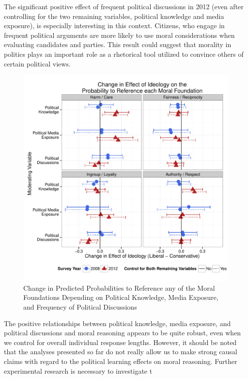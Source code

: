 \documentclass[12pt]{paper}
\begin{document}
The significant positive effect of frequent political discussions in 2012 (even after controlling for the two remaining variables, political knowledge and media exposure), is especially interesting in this context. Citizens, who engage in frequent political arguments are more likely to use moral considerations when evaluating candidates and parties. This result could suggest that morality in politics plays an important role as a rhetorical tool utilized to convince others of certain political views.

\begin{figure}\centering
\includegraphics[scale=.6]{../calc/fig/m3b_learn.pdf}
\caption{Change in Predicted Probabilities to Reference any of the Moral Foundations Depending on Political Knowledge, Media Exposure, and Frequency of Political Discussions}\label{fig:m3_learn}
\end{figure}

The positive relationships between political knowledge, media exposure, and political discussions and moral reasoning appears to be quite robust, even when we control for overall individual response lengths. However, it should be noted that the analyses presented so far do not really allow us to make strong causal claims with regard to the political learning effects on moral reasoning. Further experimental research is necessary to investigate t
\end{document}
